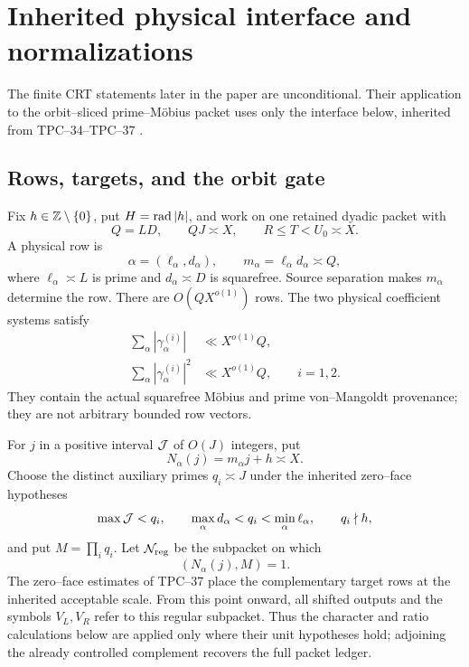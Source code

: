 \section{Inherited physical interface and normalizations}
\label{sec:tpc38-interface}

The finite CRT statements later in the paper are unconditional.  Their
application to the orbit--sliced prime--M\"obius packet uses only the
interface below, inherited from TPC--34--TPC--37
\citep{WangTPC34,WangTPC35,WangTPC36,WangTPC37}.

\subsection{Rows, targets, and the orbit gate}

Fix \(h\in\mathbb Z\setminus\{0\}\), put \(H=\operatorname{rad}|h|\), and work on one retained
dyadic packet with
\begin{equation}
 Q=LD,\qquad QJ\asymp X,\qquad R\le T<U_0\asymp X.
 \label{eq:tpc38-interface-scales}
\end{equation}
A physical row is
\begin{equation}
 \alpha=(\ell_\alpha,d_\alpha),\qquad
 m_\alpha=\ell_\alpha d_\alpha\asymp Q,
 \label{eq:tpc38-interface-row}
\end{equation}
where \(\ell_\alpha\asymp L\) is prime and \(d_\alpha\asymp D\) is
squarefree.  Source separation makes \(m_\alpha\) determine the row.
There are \(O(QX^{o(1)})\) rows.  The two physical coefficient systems
satisfy
\begin{align}
 \sum_\alpha|\gamma_\alpha^{(i)}|
 &\ll X^{o(1)}Q,
 \label{eq:tpc38-row-l1}\\
 \sum_\alpha|\gamma_\alpha^{(i)}|^2
 &\ll X^{o(1)}Q,
 \qquad i=1,2.
 \label{eq:tpc38-row-l2}
\end{align}
They contain the actual squarefree M\"obius and prime von--Mangoldt
provenance; they are not arbitrary bounded row vectors.

For \(j\) in a positive interval \(\mathcal J\) of \(O(J)\) integers, put
\begin{equation}
 N_\alpha(j)=m_\alpha j+h\asymp X.
 \label{eq:tpc38-interface-target}
\end{equation}
Choose the distinct auxiliary primes \(q_i\asymp J\) under the inherited
zero--face hypotheses
\begin{equation}
 \max\mathcal J<q_i,
 \qquad
 \max_\alpha d_\alpha<q_i<\min_\alpha\ell_\alpha,
 \qquad
 q_i\nmid h,
 \label{eq:tpc38-interface-auxiliary-prime-hypotheses}
\end{equation}
and put \(M=\prod_iq_i\).  Let \(\mathcal N_{\rm reg}\) be the subpacket on which
\begin{equation}
 (N_\alpha(j),M)=1.
 \label{eq:tpc38-interface-regular-target}
\end{equation}
The zero--face estimates of TPC--37 place the complementary target rows at
the inherited acceptable scale.  From this point onward, all shifted
outputs and the symbols \(V_L,V_R\) refer to this regular subpacket.  Thus
the character and ratio calculations below are applied only where their
unit hypotheses hold; adjoining the already controlled complement recovers
the full packet ledger.

